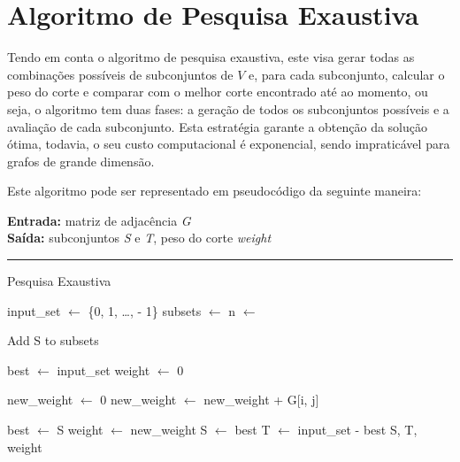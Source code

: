 \documentclass[mirror, portugues]{revdetua}
\begin{document}
\section{Algoritmo de Pesquisa Exaustiva}

Tendo em conta o algoritmo de pesquisa exaustiva, este visa gerar todas as combinações possíveis de subconjuntos de $V$ e, para cada subconjunto, calcular o peso do corte e comparar com o melhor corte encontrado até ao momento, ou seja, o algoritmo tem duas fases: a geração de todos os subconjuntos possíveis e a avaliação de cada subconjunto. Esta estratégia garante a obtenção da solução ótima, todavia, o seu custo computacional é exponencial, sendo impraticável para grafos de grande dimensão.

Este algoritmo pode ser representado em pseudocódigo da seguinte maneira:

\begin{algorithm}[H]
    \raggedright
    \textbf{Entrada:} matriz de adjacência \textit{G} \\
    \textbf{Saída:} subconjuntos \textit{S} e \textit{T}, peso do corte \textit{weight} \\
    \hrule 
    \caption{Pesquisa Exaustiva}
    \begin{algorithmic}[1]
        \State input\_set $\gets$ \{0, 1, \ldots,  - 1\}
        \State subsets $\gets$ 
        \State n $\gets$ 
        
            \State Add S to subsets
            \EndFor
        \EndFor
        
        \State best $\gets$ input\_set
        \State weight $\gets$ 0
        
            \State new\_weight $\gets$ 0
                    \State new\_weight $\gets$ new\_weight + G[i, j]
                \EndFor
            \EndFor
            
            \State best $\gets$ S
            \State weight $\gets$ new\_weight
            \EndIf
        \EndFor
        \State S $\gets$ best
        \State T $\gets$ input\_set - best
        \State \Return S, T, weight
    \end{algorithmic}
\end{algorithm}
\end{document}
